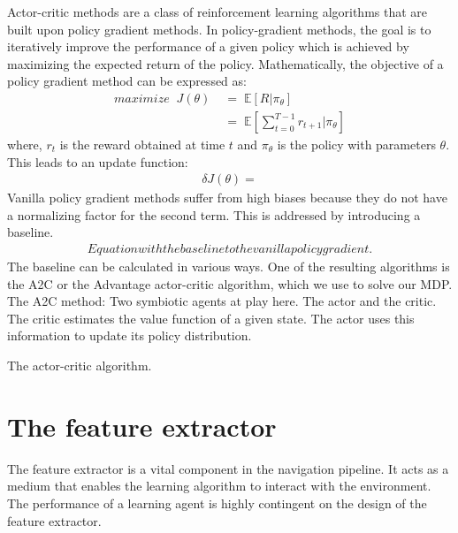 Actor-critic methods are a class of reinforcement learning algorithms that are built upon policy gradient methods. 
In policy-gradient methods, the goal is to iteratively improve the performance of a given policy which is achieved by maximizing the expected return of the policy. Mathematically, the objective of a policy gradient method can be expressed as:
\begin{align}
maximize \;\; J( \theta )  &\; = \; \mathbb{E} [ R | \pi_{\theta} ] \\
					   & \; = \; \mathbb{E}[ \sum^{T-1}_{t=0} r_{t+1}| \pi_{\theta}] 
\end{align}
where, $r_{t}$ is the reward obtained at time $t$ and $\pi_{\theta}$ is the policy with parameters $\theta$.\\
This leads to an update function:
\begin{align}
\delta J ( \theta ) = 
\end{align} 
Vanilla policy gradient methods suffer from high biases because they do not have a normalizing factor for the second term. This is addressed by introducing a 
baseline. 
\begin{align}
Equation with the baseline to the vanilla policy gradient.
\end{align}
The baseline can be calculated in various ways. One of the resulting algorithms is the A2C or the Advantage actor-critic algorithm, which we use to solve our MDP.
The A2C method:
Two symbiotic agents at play here. The actor and the critic. 
The critic estimates the value function of a given state.
The actor uses this information to update its policy distribution.
\begin{algorithm}
	The actor-critic algorithm.
\end{algorithm}


\section*{The feature extractor}
The feature extractor is a vital component in the navigation pipeline. It acts as a medium that enables the learning algorithm to interact with the environment. The performance of a learning agent is highly contingent on the design of the feature extractor. \cite{vasquez_et_al}\\

